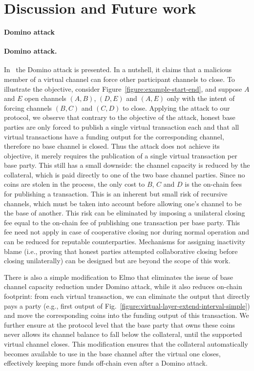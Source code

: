 \section{Discussion and Future work}
\label{sec:future-work}
\makeatletter%
%
  {\paragraph{Domino attack}}%
  {\paragraph{Domino attack.}}%
\makeatother%
In~\cite{donner} the Domino attack is presented. In a nutshell, it claims that a
malicious member of a virtual channel can force other participant channels to close. To illustrate the objective, consider
 Figure~\ref{figure:example-start-end}, and suppose  $A$ and $E$ open channels
$(A, B)$, $(D, E)$ and $(A, E)$ only with the intent of forcing channels $(B,
C)$ and $(C, D)$ to close. Applying the attack to our protocol, we observe that contrary to the objective of the attack,  honest base parties are only
forced to publish a single virtual transaction each and that all virtual
transactions have a funding output for the corresponding channel, therefore no
base channel is closed. Thus the attack does not achieve its objective, it merely requires the publication of a single virtual transaction per base
party. This still has a small downside: 
the channel capacity is reduced by the collateral, which
is paid directly to one of the two base channel parties. Since no coins are
stolen in the process, the only cost to $B$, $C$ and $D$ is the on-chain fees
for publishing a transaction. This is an inherent but small risk of
recursive channels, which must be taken into account before allowing one's
channel to be the base of another. This risk can be eliminated by imposing a
unilateral closing fee equal to the on-chain fee of publishing one transaction
per base party. This fee need not apply in case of cooperative closing nor
during normal operation and can be reduced for reputable counterparties.
Mechanisms for assigning inactivity blame (i.e., proving that honest parties
attempted collaborative closing before closing unilaterally) can be designed but
are beyond the scope of this work.

There is also a simple modification to Elmo that eliminates the issue of base channel capacity reduction under Domino attack, while it also reduces on-chain
footprint: from each virtual transaction, we can
eliminate the output that directly
pays a party (e.g., first output of
Fig.~\ref{figure:virtual-layer-extend-interval-simple}) and move the
corresponding coins into the funding output of this transaction. We further
ensure at the protocol level that the base party that owns these coins never
allows its channel balance to fall below the collateral, until the supported
virtual channel closes. This modification ensures that the collateral
automatically becomes available to use in the base channel after the virtual one
closes, effectively keeping more funds off-chain even after a Domino attack.

